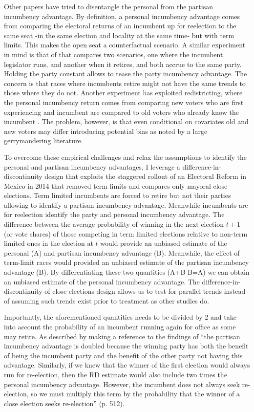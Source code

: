 \documentclass[12pt]{amsart}
\numberwithin{equation}{section}
\theoremstyle{definition}
\theoremstyle{definition}
\theoremstyle{definition}
\begin{document}
Other papers have tried to disentangle the personal from the partisan incumbency advantage. By definition, a personal incumbency advantage comes from comparing the electoral returns of an incumbent up for reelection to the same seat -in the same election and locality at the same time- but with term limits. This makes the open seat a counterfactual scenario. A similar experiment in mind is that of \citet{gelman_king_1990} that compares two scenarios, one where the incumbent legislator runs, and another when it retires, and both accrue to the same party. Holding the party constant allows to tease the party incumbency advantage. The concern is that races where incumbents retire might not have the same trends to those where they do not. Another experiment has exploited redistricting, where the personal incumbency return comes from comparing  new voters who are first experiencing and incumbent are compared to old voters who already know the incumbent \citep{sekhon_titiunik_2012}. The problem, however, is that even conditional on covariates old and new voters may differ introducing potential bias as noted by a large gerrymandering literature. 

To overcome these empirical challenges and relax the  assumptions to identify the personal and partisan incumbency advantages, I leverage a difference-in-discontinuity design that exploits the staggered rollout of an Electoral Reform in Mexico in 2014 that removed term limits and compares only mayoral close elections. Term limited incumbents are forced to retire but not their parties allowing to identify a partisan incumbency advantage. Meanwhile incumbents are for reelection identify the party and personal incumbency advantage. The difference between the average probability of winning in the next election $t+1$ (or vote shares) of those competing in term limited elections relative to non-term limited ones in the election at $t$ would provide an unbiased estimate of the personal (A) and partisan incumbency advantage (B). Meanwhile, the effect of term-limit races would provided an unbiased estimate of the partisan incumbency advantage (B). By differentiating these two quantities (A+B-B=A) we can obtain an unbiased estimate of the personal incumbency advantage. The difference-in-discontinuity of close elections design allows us to test for parallel trends instead of assuming such trends exist prior to treatment as other studies do.

Importantly, the aforementioned quantities needs to be divided by 2 and take into account the probability of an incumbent running again for office as some may retire. As described by \citet{fowler_hall_2014} making a reference to the findings of \citet{erikson_titiunik_2015} ``the partisan incumbency advantage is doubled because the winning party has both the benefit of being the incumbent party and the benefit of the other party not having this advantage. Similarly, if we knew that the winner of the first election would always run for re-election, then the RD estimate would also include two times the personal incumbency advantage. However, the incumbent does not always seek re-election, so we must multiply this term by the probability that the winner of a close election seeks re-election'' (p. 512). 
\end{document}
